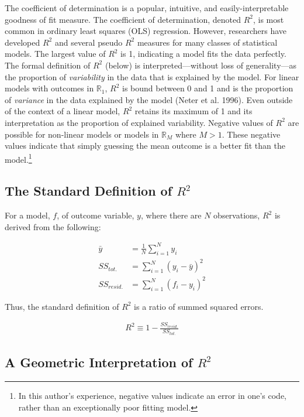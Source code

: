 \documentclass[conference,final,]{IEEEtran}
\begin{document}
The coefficient of determination is a popular, intuitive, and
easily-interpretable goodness of fit measure. The coefficient of
determination, denoted \(R^2\), is most common in ordinary least squares
(OLS) regression. However, researchers have developed \(R^2\) and
several pseudo \(R^2\) measures for many classes of statistical models.
The largest value of \(R^2\) is 1, indicating a model fits the data
perfectly. The formal definition of \(R^2\) (below) is
interpreted---without loss of generality---as the proportion of
\emph{variability} in the data that is explained by the model. For
linear models with outcomes in \(\mathbb{R}_1\), \(R^2\) is bound
between 0 and 1 and is the proportion of \emph{variance} in the data
explained by the model (Neter et al. 1996). Even outside of the context
of a linear model, \(R^2\) retains its maximum of 1 and its
interpretation as the proportion of explained variability. Negative
values of \(R^2\) are possible for non-linear models or models in
\(\mathbb{R}_M\) where \(M > 1\). These negative values indicate that
simply guessing the mean outcome is a better fit than the
model.\footnote{In this author's experience, negative values indicate an
  error in one's code, rather than an exceptionally poor fitting model.}

\hypertarget{the-standard-definition-of-r2}{%
\subsection{\texorpdfstring{The Standard Definition of
\(R^2\)}{The Standard Definition of R\^{}2}}\label{the-standard-definition-of-r2}}

For a model, \(f\), of outcome variable, \(y\), where there are \(N\)
observations, \(R^2\) is derived from the following:

\begin{align}
  \bar{y} &= \frac{1}{N}\sum_{i=1}^{N}y_i\\
  SS_{tot.} &= \sum_{i=1}^N{(y_i-\bar{y})^2}\\
  SS_{resid.} &= \sum_{i=1}^N{(f_i-y_i)^2}
\end{align}

Thus, the standard definition of \(R^2\) is a ratio of summed squared
errors.

\begin{align}
    R^2 \equiv 1 - \frac{SS_{resid.}}{SS_{tot.}}
\end{align}

\hypertarget{a-geometric-interpretation-of-r2}{%
\subsection{\texorpdfstring{A Geometric Interpretation of
\(R^2\)}{A Geometric Interpretation of R\^{}2}}\label{a-geometric-interpretation-of-r2}}
\end{document}
